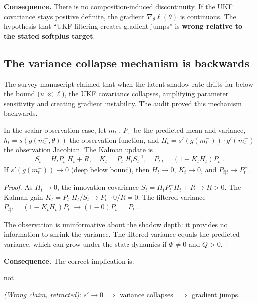 \textbf{Consequence.} There is no composition-induced discontinuity. If the UKF covariance stays positive definite, the gradient $\nabla_\theta \ell(\theta)$ is continuous. The hypothesis that ``UKF filtering creates gradient jumps'' is \textbf{wrong relative to the stated softplus target}.


\subsection{The variance collapse mechanism is backwards}

The survey manuscript claimed that when the latent shadow rate drifts far below the bound ($u \ll \ell$), the UKF covariance collapses, amplifying parameter sensitivity and creating gradient instability. The audit proved this mechanism backwards.

\begin{proposition}
\label{prop:variance-preserved}
In the scalar observation case, let $m_t^-$, $P_t^-$ be the predicted mean and variance, $h_t = s(g(m_t^-, \theta))$ the observation function, and $H_t = s'(g(m_t^-)) \cdot g'(m_t^-)$ the observation Jacobian. The Kalman update is
\begin{equation}\label{eq:kalman-update}
S_t = H_t P_t^- H_t + R, \quad K_t = P_t^- H_t S_t^{-1}, \quad P_{t|t} = (1 - K_t H_t) P_t^-.
\end{equation}
If $s'(g(m_t^-)) \to 0$ (deep below bound), then $H_t \to 0$, $K_t \to 0$, and $P_{t|t} \to P_t^-$.
\end{proposition}

\begin{proof}
As $H_t \to 0$, the innovation covariance $S_t = H_t P_t^- H_t + R \to R > 0$. The Kalman gain $K_t = P_t^- H_t / S_t \to P_t^- \cdot 0 / R = 0$. The filtered variance $P_{t|t} = (1 - K_t H_t) P_t^- \to (1 - 0) P_t^- = P_t^-$.

The observation is uninformative about the shadow depth: it provides no information to shrink the variance. The filtered variance equals the predicted variance, which can grow under the state dynamics if $\Phi \neq 0$ and $Q > 0$.
\end{proof}

\textbf{Consequence.} The correct implication is:
\begin{center}
\end{center}
not
\begin{center}
\textit{(Wrong claim, retracted)}: $s' \to 0 \implies$ variance collapses $\implies$ gradient jumps.
\end{center}

